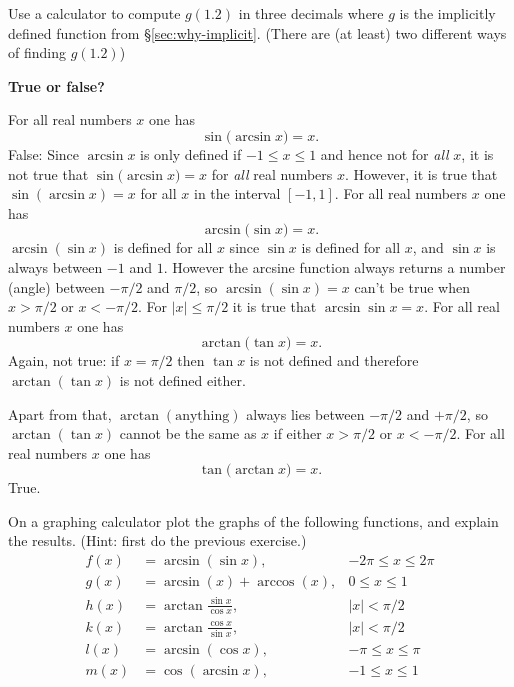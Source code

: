 \begin{multicols}{2}
\problem Use a calculator to compute $g(1.2)$ in three decimals where $g$ 
is the implicitly defined function from \S\ref{sec:why-implicit}.  (There
are (at least) two different ways of finding $g(1.2)$)

\problem \label{ex:01sine-of-arcsine} \groupproblem 
\textbf{True or false?}

\subprob For all real numbers $x$ one has
\[
  \sin\bigl(\arcsin x\bigr) = x.
\]
\answer 
False: Since $\arcsin x$ is only defined if $-1\leq x\leq 1$ and hence
not for \emph{all} $x$, it is not true that $\sin\bigl(\arcsin
x\bigr) = x$ for \emph{all} real numbers $x$.
However, it is true that $\sin(\arcsin x) = x$ for all $x$ in
the interval $[-1,1]$.
\endanswer
\subprob For all real numbers $x$ one has
\[
  \arcsin\bigl(\sin x\bigr) = x.
\]
\answer 
$\arcsin(\sin x)$ is defined for all $x$ since $\sin x$ is
defined for all $x$, and $\sin x$ is always between $-1$ and $1$.
However the arcsine function always returns a number (angle) between
$-\pi/2$ and $\pi/2$, so $\arcsin( \sin x) = x$ can't be true when
$x>\pi/2$ or $x<-\pi/2$.  For $|x|\leq \pi/2$ it is true that $\arcsin
\sin x = x$.
\endanswer
\subprob For all real numbers $x$ one has
\[
  \arctan\bigl( \tan x\bigr) = x.
\]
\answer 
Again, not true: if $x=\pi/2$ then $\tan x$ is not defined and therefore
$\arctan(\tan x)$ is not defined either.


Apart from that, $\arctan (\text{anything})$ always lies
between $-\pi/2 $ and $+\pi/2$, so $\arctan(\tan x)$ cannot
be the same as $x$ if either $x>\pi/2$ or $x<-\pi/2$.
\endanswer
\subprob For all real numbers $x$ one has
\[
  \tan\bigl( \arctan x\bigr) = x.
\]
\answer 
True.
\endanswer


\problem On a graphing calculator plot the graphs of the following 
functions, and explain the results. (Hint: first do the previous exercise.)
\begin{align*}
  f(x) &= \arcsin(\sin x),  &  -2\pi\leq x\leq 2\pi \\
  g(x) &= \arcsin(x) + \arccos(x),  &  0\leq x\leq 1 \\
  h(x) &= \arctan\frac{\sin x}{\cos x},  &  |x|< \pi/2 \\
  k(x) &= \arctan\frac{\cos x}{\sin x},  &  |x|< \pi/2 \\
  l(x) &= \arcsin(\cos x),  &  -\pi\leq x\leq \pi \\
  m(x) &= \cos(\arcsin x), & -1\leq x\leq 1
\end{align*}






\end{multicols}
